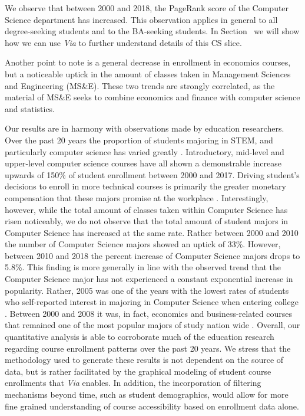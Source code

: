 We observe that between 2000 and 2018, the PageRank score of the
Computer Science department has increased. This observation applies in
general to all degree-seeking students and to the BA-seeking
students. In Section~ we will show
how we can use {\em Via} to further understand details of this CS
slice.

Another point to note is a general decrease in enrollment in economics
courses, but a noticeable uptick in the amount of classes taken in
Management Sciences and Engineering (MS\&E). These two trends are
strongly correlated, as the material of MS\&E seeks to combine
economics and finance with computer science and statistics.

Our results are in harmony with observations made by education researchers. Over the past 20 years the proportion of students majoring in STEM, and particularly computer science has varied greatly \cite{ComputingResearchAssociation2017}. Introductory, mid-level and upper-level computer science courses have all shown a demonstrable increase upwards of 150\% of student enrollment between 2000 and 2017. Driving student's decisions to enroll in more technical courses is primarily the greater monetary compensation that these majors promise at the workplace \cite{Downey2007}. Interestingly, however, while the total amount of classes taken within Computer Science has risen noticeably, we do not observe that the total amount of student majors in Computer Science has increased at the same rate. Rather between 2000 and 2010 the number of Computer Science majors showed an uptick of 33\%. However, between 2010 and 2018 the percent increase of Computer Science majors drops to 5.8\%. This finding is more generally in line with the observed trend that the Computer Science major has not experienced a constant exponential increase in popularity. Rather, 2005 was one of the years with the lowest rates of students who self-reported interest in majoring in Computer Science when entering college \cite{Patterson2005}. Between 2000 and 2008 it was, in fact, economics and business-related courses that remained one of the most popular majors of study nation wide \cite{NationalCenterforEducation2018}. Overall, our quantitative analysis is able to corroborate much of the education research regarding course enrollment patterns over the past 20 years. We stress that the methodology used to generate these results is not dependent on the source of data, but is rather facilitated by the graphical modeling of student course enrollments that \textit{Via} enables. In addition, the incorporation of filtering mechanisms beyond time, such as student demographics, would allow for more fine grained understanding of course accessibility based on enrollment data alone.
